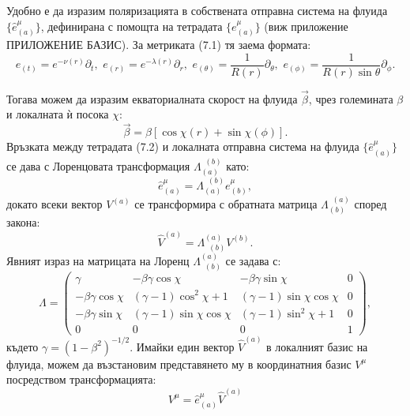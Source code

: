 Удобно е да изразим поляризацията в собствената отправна система на флуида $\{\hat{e}^\mu_{(a)}\}$, дефинирана с помощта на тетрадата $\{e^\mu_{(a)}\}$ (виж приложение ПРИЛОЖЕНИЕ БАЗИС). За метриката (7.1) тя заема формата:
\begin{equation}
	e_{(t)} = e^{-\nu(r)}\partial_t,\,\, e_{(r)} = e^{-\lambda(r)}\partial_r,\,\, e_{(\theta)} = \frac{1}{R(r)}\partial_{\theta},\,\, e_{(\phi)} = \frac{1}{R(r)\sin\theta}\partial_{\phi}.
\end{equation}

Тогава можем да изразим екваториалната скорост на флуида $\vec{\beta}$, чрез големината $\beta$ и локалната ѝ посока $\chi$:
\begin{equation}
	\vec{\beta} = \beta\left[\cos\chi (r) + \sin\chi (\phi)\right].
\end{equation}
Връзката между тетрадата (7.2) и локалната отправна система на флуида $\{\hat{e}^\mu_{(a)}\}$ се дава с Лоренцовата трансформация $\Lambda^{\,\,\,(b)}_{(a)}$ като:
\begin{equation}
	\hat{e}^\mu_{(a)} = \Lambda^{\,\,\,(b)}_{(a)}e^\mu_{(b)},
\end{equation}
докато всеки вектор $V^{(a)}$ се трансформира с обратната матрица $\Lambda^{\,\,\,(a)}_{(b)}$ според закона:
\begin{equation}
	\hat{V}^{(a)} = \Lambda^{(a)}_{\,\,\,(b)} V^{(b)}.
\end{equation}
Явният израз на матрицата на Лоренц $\Lambda^{(a)}_{\,\,\,(b)}$ се задава с:
\begin{equation}
	\Lambda = \begin{pmatrix}
			\gamma 			 & -\beta\gamma\cos\chi 	    & -\beta\gamma\sin\chi 		   & 0 \\
		-\beta\gamma\cos\chi & (\gamma - 1)\cos^2\chi + 1   & (\gamma - 1)\sin\chi\cos\chi & 0 \\
		-\beta\gamma\sin\chi & (\gamma - 1)\sin\chi\cos\chi & (\gamma - 1)\sin^2\chi + 1   & 0 \\
				0			 &					0			&				0			   & 1
	\end{pmatrix},
\end{equation}
където $\gamma = (1 - \beta^2)^{-1/2}$. Имайки един вектор $\hat{V}^{(a)}$ в локалният базис на флуида, можем да възстановим представянето му в координатния базис $V^\mu$ посредством трансформацията:
\begin{equation}
	V^\mu = \hat{e}^\mu_{(a)}\hat{V}^{(a)}
\end{equation}

